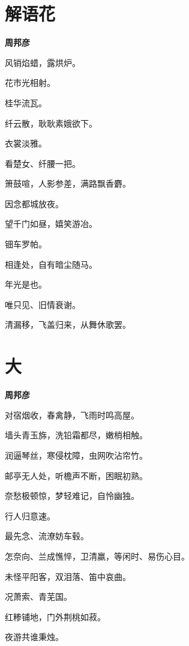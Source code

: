 \documentclass[12pt,a4paper]{ctexbook}
\begin{document}
\section{解语花}
\textbf{周邦彦}\par\vspace{0.5em}
风销焰蜡，露烘炉。\par
花市光相射。\par
桂华流瓦。\par
纤云散，耿耿素娥欲下。\par
衣裳淡雅。\par
看楚女、纤腰一把。\par
箫鼓喧，人影参差，满路飘香麝。\par
因念都城放夜。\par
望千门如昼，嬉笑游冶。\par
钿车罗帕。\par
相逢处，自有暗尘随马。\par
年光是也。\par
唯只见、旧情衰谢。\par
清漏移，飞盖归来，从舞休歌罢。\par

\section{大}
\textbf{周邦彦}\par\vspace{0.5em}
对宿烟收，春禽静，飞雨时鸣高屋。\par
墙头青玉旆，洗铅霜都尽，嫩梢相触。\par
润逼琴丝，寒侵枕障，虫网吹沾帘竹。\par
邮亭无人处，听檐声不断，困眠初熟。\par
奈愁极顿惊，梦轻难记，自怜幽独。\par
行人归意速。\par
最先念、流潦妨车毂。\par
怎奈向、兰成憔悴，卫清羸，等闲时、易伤心目。\par
未怪平阳客，双泪落、笛中哀曲。\par
况萧索、青芜国。\par
红糁铺地，门外荆桃如菽。\par
夜游共谁秉烛。\par
\end{document}
